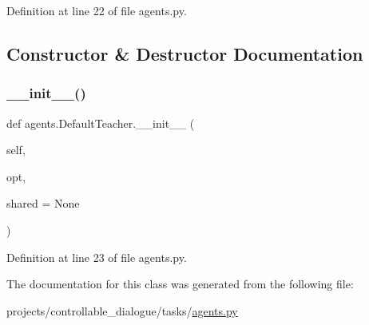 Definition at line 22 of file agents.\+py.



\subsection{Constructor \& Destructor Documentation}
\mbox{\label{classagents_1_1DefaultTeacher_a0055a4fda9308a8ab022ba742256434d}} 
\subsubsection{\texorpdfstring{\+\_\+\+\_\+init\+\_\+\+\_\+()}{\_\_init\_\_()}}
{\footnotesize\ttfamily def agents.\+Default\+Teacher.\+\_\+\+\_\+init\+\_\+\+\_\+ (\begin{DoxyParamCaption}\item[{}]{self,  }\item[{}]{opt,  }\item[{}]{shared = {\ttfamily None} }\end{DoxyParamCaption})}



Definition at line 23 of file agents.\+py.



The documentation for this class was generated from the following file\+:\begin{DoxyCompactItemize}
\item 
projects/controllable\+\_\+dialogue/tasks/\hyperlink{projects_2controllable__dialogue_2tasks_2agents_8py}{agents.\+py}\end{DoxyCompactItemize}
